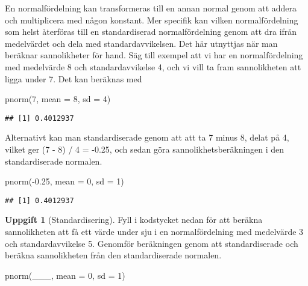 \documentclass[
]{book}
\newenvironment{Shaded}{\begin{snugshade}}{\end{snugshade}}
\newcommand{\AttributeTok}[1]{\textcolor[rgb]{0.77,0.63,0.00}{#1}}
\newcommand{\DecValTok}[1]{\textcolor[rgb]{0.00,0.00,0.81}{#1}}
\newcommand{\FloatTok}[1]{\textcolor[rgb]{0.00,0.00,0.81}{#1}}
\newcommand{\FunctionTok}[1]{\textcolor[rgb]{0.00,0.00,0.00}{#1}}
\newcommand{\NormalTok}[1]{#1}
\newcommand{\SpecialCharTok}[1]{\textcolor[rgb]{0.00,0.00,0.00}{#1}}
\theoremstyle{definition}
\theoremstyle{definition}
\theoremstyle{definition}
\newtheorem{exercise}{Uppgift}[chapter]
\theoremstyle{definition}
\theoremstyle{remark}
\begin{document}
En normalfördelning kan transformeras till en annan normal genom att addera och multiplicera med någon konstant. Mer specifik kan vilken normalfördelning som helst återföras till en standardiserad normalfördelning genom att dra ifrån medelvärdet och dela med standardavvikelsen. Det här utnyttjas när man beräknar sannolikheter för hand. Säg till exempel att vi har en normalfördelning med medelvärde 8 och standardavvikelse 4, och vi vill ta fram sannolikheten att ligga under 7. Det kan beräknas med

\begin{Shaded}
\begin{Highlighting}[]
\FunctionTok{pnorm}\NormalTok{(}\DecValTok{7}\NormalTok{, }\AttributeTok{mean =} \DecValTok{8}\NormalTok{, }\AttributeTok{sd =} \DecValTok{4}\NormalTok{)}
\end{Highlighting}
\end{Shaded}

\begin{verbatim}
## [1] 0.4012937
\end{verbatim}

Alternativt kan man standardiserade genom att att ta 7 minus 8, delat på 4, vilket ger (7 - 8) / 4 = -0.25, och sedan göra sannolikhetsberäkningen i den standardiserade normalen.

\begin{Shaded}
\begin{Highlighting}[]
\FunctionTok{pnorm}\NormalTok{(}\SpecialCharTok{{-}}\FloatTok{0.25}\NormalTok{, }\AttributeTok{mean =} \DecValTok{0}\NormalTok{, }\AttributeTok{sd =} \DecValTok{1}\NormalTok{)}
\end{Highlighting}
\end{Shaded}

\begin{verbatim}
## [1] 0.4012937
\end{verbatim}

\begin{exercise}[Standardisering]

Fyll i kodstycket nedan för att beräkna sannolikheten att få ett värde under sju i en normalfördelning med medelvärde 3 och standardavvikelse 5. Genomför beräkningen genom att standardiserade och beräkna sannolikheten från den standardiserade normalen.

\begin{Shaded}
\begin{Highlighting}[]
\FunctionTok{pnorm}\NormalTok{(\_\_\_, }\AttributeTok{mean =} \DecValTok{0}\NormalTok{, }\AttributeTok{sd =} \DecValTok{1}\NormalTok{)}
\end{Highlighting}
\end{Shaded}

\end{exercise}
\end{document}
